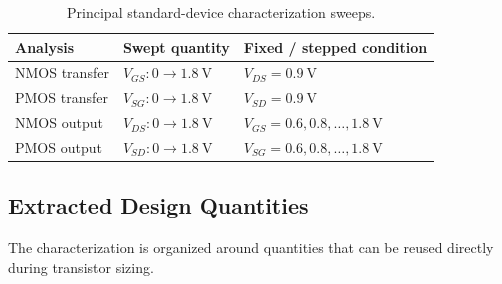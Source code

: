 \begin{table}[H]
	\centering
	\small
	\caption{Principal standard-device characterization sweeps.}
	\label{tab:characterization_sweeps}
	
	\begin{tabular}{lll}
		\toprule
		Analysis & Swept quantity & Fixed / stepped condition \\
		\midrule
		
		NMOS transfer &
		$V_{GS}: 0 \rightarrow \qty{1.8}{\volt}$ &
		$V_{DS}=\qty{0.9}{\volt}$ \\
		
		PMOS transfer &
		$V_{SG}: 0 \rightarrow \qty{1.8}{\volt}$ &
		$V_{SD}=\qty{0.9}{\volt}$ \\
		
		NMOS output &
		$V_{DS}: 0 \rightarrow \qty{1.8}{\volt}$ &
		$V_{GS}=0.6,0.8,\ldots,1.8~\mathrm{V}$ \\
		
		PMOS output &
		$V_{SD}: 0 \rightarrow \qty{1.8}{\volt}$ &
		$V_{SG}=0.6,0.8,\ldots,1.8~\mathrm{V}$ \\
		
		\bottomrule
	\end{tabular}
\end{table}



\subsection{Extracted Design Quantities}

The characterization is organized around quantities that can be reused
directly during transistor sizing.

